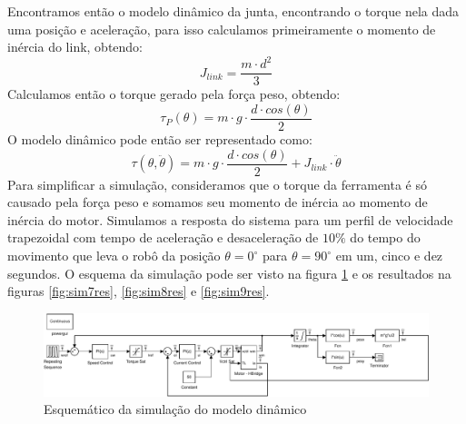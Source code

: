 \documentclass{article}
\begin{document}
Encontramos então o modelo dinâmico da junta, encontrando o torque nela dada uma posição e aceleração, para isso calculamos primeiramente o momento de inércia do link, obtendo:
\begin{equation}
	J_{link} = \frac{m\cdot d^2}{3}
\end{equation}
Calculamos então o torque gerado pela força peso, obtendo:
\begin{equation}
	\tau_{P}(\theta) = m\cdot g\cdot \frac{d\cdot cos(\theta)}{2}
\end{equation}
O modelo dinâmico pode então ser representado como:
\begin{equation}
	\tau(\theta, \ddot{\theta}) = m\cdot g\cdot \frac{d\cdot cos(\theta)}{2} + J_{link}\cdot \ddot{\theta}
\end{equation}
Para simplificar a simulação, consideramos que o torque da ferramenta é só causado pela força peso e somamos seu momento de inércia ao momento de inércia do motor. Simulamos a resposta do sistema para um perfil de velocidade trapezoidal com tempo de aceleração e desaceleração de $10\%$ do tempo do movimento que leva o robô da posição $\theta=0^\circ$ para $\theta=90^\circ$ em um, cinco e dez segundos. O esquema da simulação pode ser visto na figura \ref{fig:sim7} e os resultados na figuras \ref{fig:sim7res}, \ref{fig:sim8res} e \ref{fig:sim9res}.

\begin{figure}[H]
	\centering
	\includegraphics[width=\linewidth]{matlab/sim7}
	\caption{Esquemático da simulação do modelo dinâmico}
	\label{fig:sim7}
\end{figure}
\end{document}
